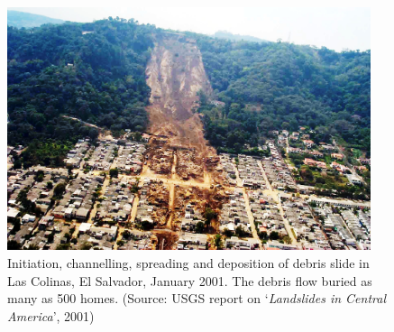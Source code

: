 \begin{figure}[htbp]
\centering
\includegraphics[width=0.95\textwidth]{Debrisflow}
\caption[Debris slide in Las Colinas, El Salvador, January 2001]{Initiation, 
channelling, spreading and deposition of debris slide in Las Colinas, El 
Salvador, January 2001. The debris flow buried as many as 500 homes. (Source: 
USGS report on `\textit{Landslides in Central America}', 2001)}
\label{fig:debris}
\end{figure}


